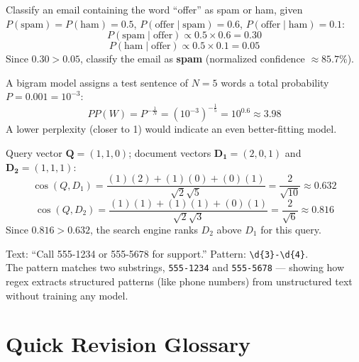 \documentclass[11pt,a4paper]{article}
\begin{document}
\begin{examplebox}
Classify an email containing the word ``offer'' as spam or ham, given $P(\text{spam})=P(\text{ham})=0.5$, $P(\text{offer}\mid\text{spam})=0.6$, $P(\text{offer}\mid\text{ham})=0.1$:
$$
P(\text{spam}\mid\text{offer}) \propto 0.5 \times 0.6 = 0.30
$$
$$
P(\text{ham}\mid\text{offer}) \propto 0.5 \times 0.1 = 0.05
$$
Since $0.30 > 0.05$, classify the email as \textbf{spam} (normalized confidence $\approx 85.7\%$).
\end{examplebox}

\begin{examplebox}
A bigram model assigns a test sentence of $N=5$ words a total probability $P=0.001=10^{-3}$:
$$
PP(W) = P^{-\frac{1}{N}} = \left(10^{-3}\right)^{-\frac{1}{5}} = 10^{0.6} \approx 3.98
$$
A lower perplexity (closer to 1) would indicate an even better-fitting model.
\end{examplebox}

\begin{examplebox}
Query vector $\mathbf{Q}=(1,1,0)$; document vectors $\mathbf{D_1}=(2,0,1)$ and $\mathbf{D_2}=(1,1,1)$:
$$
\cos(Q,D_1) = \frac{(1)(2)+(1)(0)+(0)(1)}{\sqrt{2}\sqrt{5}} = \frac{2}{\sqrt{10}} \approx 0.632
$$
$$
\cos(Q,D_2) = \frac{(1)(1)+(1)(1)+(0)(1)}{\sqrt{2}\sqrt{3}} = \frac{2}{\sqrt{6}} \approx 0.816
$$
Since $0.816 > 0.632$, the search engine ranks $D_2$ above $D_1$ for this query.
\end{examplebox}

\begin{examplebox}
Text: ``Call 555-1234 or 555-5678 for support.'' Pattern: \texttt{\textbackslash d\{3\}-\textbackslash d\{4\}}.\\
The pattern matches two substrings, \texttt{555-1234} and \texttt{555-5678} --- showing how regex extracts structured patterns (like phone numbers) from unstructured text without training any model.
\end{examplebox}

\section{Quick Revision Glossary}
\end{document}
